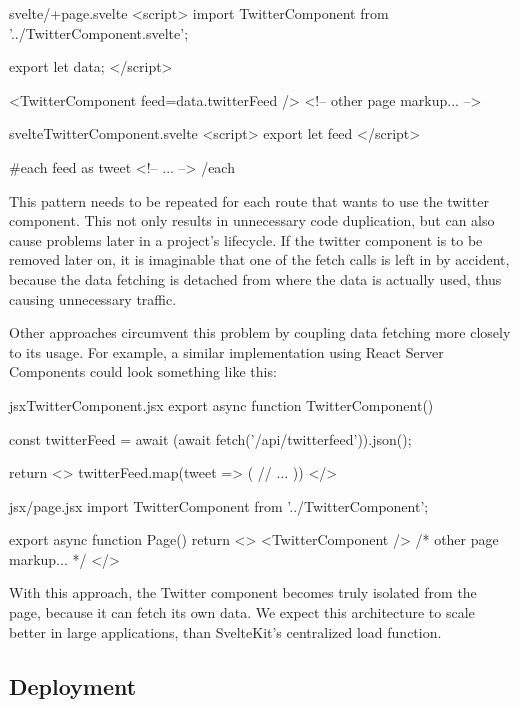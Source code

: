 \begin{myminted}{svelte}{/+page.svelte}
<script>
    import TwitterComponent from '../TwitterComponent.svelte';

    export let data;
</script>

<TwitterComponent feed={data.twitterFeed} />
<!-- other page markup... -->
\end{myminted}

\begin{myminted}{svelte}{TwitterComponent.svelte}
<script>
    export let feed
</script>

{#each feed as tweet}
    <!-- ... -->
{/each}
\end{myminted}

This pattern needs to be repeated for each route that wants to use the twitter component. This not only results in unnecessary code duplication, but can also cause problems later in a project's lifecycle. If the twitter component is to be removed later on, it is imaginable that one of the fetch calls is left in by accident, because the data fetching is detached from where the data is actually used, thus causing unnecessary traffic.

Other approaches circumvent this problem by coupling data fetching more closely to its usage. For example, a similar implementation using React Server Components could look something like this:

\begin{myminted}{jsx}{TwitterComponent.jsx}
export async function TwitterComponent() {
    const twitterFeed = await (await fetch('/api/twitterfeed')).json();

    return <>
        {twitterFeed.map(tweet => (
            // ...
        ))}
    </>
}
\end{myminted}

\begin{myminted}{jsx}{/page.jsx}
import TwitterComponent from '../TwitterComponent';

export async function Page() {
    return <>
        <TwitterComponent />
        { /* other page markup... */ }
    </>
}
\end{myminted}

With this approach, the Twitter component becomes truly isolated from the page, because it can fetch its own data. We expect this architecture to scale better in large applications, than SvelteKit's centralized load function.


\subsection{Deployment}

